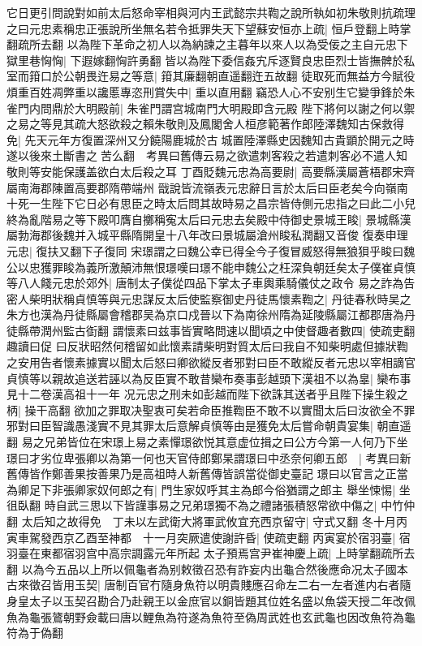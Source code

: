 它日更引問說對如前太后怒命宰相與河内王武懿宗共鞫之說所執如初朱敬則抗疏理之曰元忠素稱忠正張說所坐無名若令抵罪失天下望蘇安恒亦上疏|{
	恒戶登翻上時掌翻疏所去翻}
以為陛下革命之初人以為納諫之主暮年以來人以為受佞之主自元忠下獄里巷恟恟|{
	下遐嫁翻恟許勇翻}
皆以為陛下委信姦宄斥逐賢良忠臣烈士皆撫髀於私室而箝口於公朝畏迕易之等意|{
	箝其廉翻朝直遥翻迕五故翻}
徒取死而無益方今賦役煩重百姓凋弊重以讒慝專恣刑賞失中|{
	重以直用翻}
竊恐人心不安别生它變爭鋒於朱雀門内問鼎於大明殿前|{
	朱雀門謂宫城南門大明殿即含元殿}
陛下將何以謝之何以禦之易之等見其疏大怒欲殺之賴朱敬則及鳳閣舍人桓彦範著作郎陸澤魏知古保救得免|{
	先天元年方復置深州又分饒陽鹿城於古城置陸澤縣史因魏知古貴顕於開元之時遂以後來土斷書之苦么翻　考異曰舊傳云易之欲遣刺客殺之若遣刺客必不遣人知敬則等安能保護盖欲白太后殺之耳}
丁酉貶魏元忠為高要尉|{
	高要縣漢屬蒼梧郡宋齊屬南海郡陳置高要郡隋帶端州}
戩說皆流嶺表元忠辭日言於太后曰臣老矣今向嶺南十死一生陛下它日必有思臣之時太后問其故時易之昌宗皆侍側元忠指之曰此二小兒終為亂階易之等下殿叩膺自擲稱寃太后曰元忠去矣殿中侍御史景城王睃|{
	景城縣漢屬勃海郡後魏并入城平縣隋開皇十八年改曰景城屬滄州睃私潤翻又音俊}
復奏申理元忠|{
	復扶又翻下子復同}
宋璟謂之曰魏公幸已得全今子復冒威怒得無狼狽乎睃曰魏公以忠獲罪睃為義所激顛沛無恨璟嘆曰璟不能申魏公之枉深負朝廷矣太子僕崔貞慎等八人餞元忠於郊外|{
	唐制太子僕從四品下掌太子車輿乘騎儀仗之政令}
易之詐為告密人柴明狀稱貞慎等與元忠謀反太后使監察御史丹徒馬懷素鞫之|{
	丹徒春秋時吴之朱方也漢為丹徒縣屬會稽郡吴為京口戍晉以下為南徐州隋為延陵縣屬江都郡唐為丹徒縣帶潤州監古衘翻}
謂懷素曰兹事皆實略問速以聞頃之中使督趣者數四|{
	使疏吏翻趣讀曰促}
曰反狀昭然何稽留如此懷素請柴明對質太后曰我自不知柴明處但據狀鞫之安用告者懷素據實以聞太后怒曰卿欲縱反者邪對曰臣不敢縱反者元忠以宰相謫官貞慎等以親故追送若誣以為反臣實不敢昔欒布奏事彭越頭下漢祖不以為辠|{
	欒布事見十二卷漢高祖十一年}
况元忠之刑未如彭越而陛下欲誅其送者乎且陛下操生殺之柄|{
	操干高翻}
欲加之罪取决聖衷可矣若命臣推鞫臣不敢不以實聞太后曰汝欲全不罪邪對曰臣智識愚淺實不見其罪太后意解貞慎等由是獲免太后嘗命朝貴宴集|{
	朝直遥翻}
易之兄弟皆位在宋璟上易之素憚璟欲悦其意虚位揖之曰公方今第一人何乃下坐璟曰才劣位卑張卿以為第一何也天官侍郎鄭杲謂璟曰中丞奈何卿五郎　|{
	考異曰新舊傳皆作鄭善果按善果乃是高祖時人新舊傳皆誤當從御史臺記}
璟曰以官言之正當為卿足下非張卿家奴何郎之有|{
	門生家奴呼其主為郎今俗猶謂之郎主}
舉坐悚惕|{
	坐徂臥翻}
時自武三思以下皆謹事易之兄弟璟獨不為之禮諸張積怒常欲中傷之|{
	中竹仲翻}
太后知之故得免　丁未以左武衛大將軍武攸宜充西京留守|{
	守式又翻}
冬十月丙寅車駕發西京乙酉至神都　十一月突厥遣使謝許昏|{
	使疏吏翻}
丙寅宴於宿羽臺|{
	宿羽臺在東都宿羽宫中高宗調露元年所起}
太子預焉宫尹崔神慶上疏|{
	上時掌翻疏所去翻}
以為今五品以上所以佩龜者為别敕徵召恐有詐妄内出龜合然後應命况太子國本古來徵召皆用玉契|{
	唐制百官冇隨身魚符以明貴賤應召命左二右一左者進内右者隨身皇太子以玉契召勘合乃赴親王以金庶官以銅皆題其位姓名盛以魚袋天授二年改佩魚為龜張鷟朝野僉載曰唐以鯉魚為符遂為魚符至偽周武姓也玄武龜也因改魚符為龜符為于偽翻}
